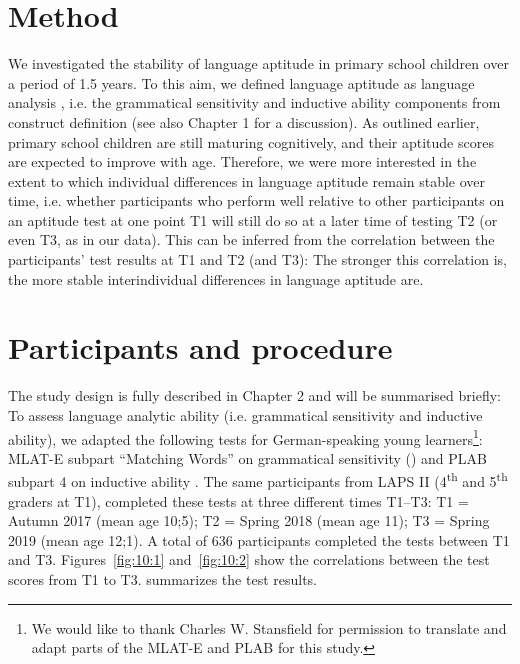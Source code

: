 \documentclass[output=paper]{langsci/langscibook}
\begin{document}
\section{Method}

We investigated the stability of language aptitude in primary school children over a period of 1.5 years. To this aim, we defined language aptitude as language analysis \citep{Skehan1998}, i.e. the grammatical sensitivity and inductive ability components from  construct definition (see also Chapter 1 for a discussion). As outlined earlier, primary school children are still maturing cognitively, and their aptitude scores are expected to improve with age. Therefore, we were more interested in the extent to which individual differences in language aptitude remain stable over time, i.e. whether participants who perform well relative to other participants on an aptitude test at one point T1 will still do so at a later time of testing T2 (or even T3, as in our data). This can be inferred from the correlation between the participants’ test results at T1 and T2 (and T3): The stronger this correlation is, the more stable interindividual differences in language aptitude are. 

 \section{Participants and procedure}


The study design is fully described in Chapter 2 and will be summarised briefly: To assess language analytic ability (i.e. grammatical sensitivity and inductive ability), we adapted the following tests for German-speaking young learners\footnote{We would like to thank Charles W. Stansfield for permission to translate and adapt parts of the MLAT-E and PLAB for this study.}: MLAT-E subpart “Matching Words” on grammatical sensitivity (\citealt{CarrollSapon1976}) and PLAB subpart 4 on inductive ability \citep{PimsleurEtAl2004}. The same participants from LAPS II (4\textsuperscript{th} and 5\textsuperscript{th} graders at T1), completed these tests at three different times T1--T3: T1 = Autumn 2017 (mean age 10;5); T2 = Spring 2018 (mean age 11); T3 = Spring 2019 (mean age 12;1). A total of 636 participants completed the tests between T1 and T3. Figures~\ref{fig:10:1} and~\ref{fig:10:2} show the correlations between the test scores from T1 to T3.  summarizes the test results. 
\end{document}
